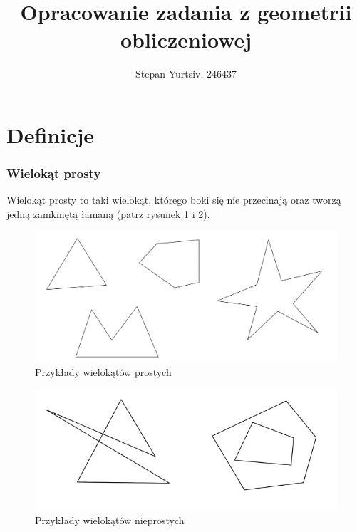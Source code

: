 \documentclass[12pt, a4paper]{article}
\title{Opracowanie zadania z geometrii obliczeniowej}
\author{Stepan Yurtsiv, 246437}
\begin{document}
\maketitle

\section*{Definicje}

\subsubsection*{Wielokąt prosty}

Wielokąt prosty to taki wielokąt, którego boki się nie przecinają oraz tworzą jedną zamkniętą łamaną (patrz rysunek \ref{fig:wielokat_prosty} i \ref{fig:wielokat_nieprosty}).

\begin{figure}[H]
  \begin{center}
  \includegraphics[scale=0.4]{Prosty}
  \caption{Przykłady wielokątów prostych}
  \label{fig:wielokat_prosty}
  \end{center}
\end{figure}

\begin{figure}[H]
  \begin{center}
  \includegraphics[scale=0.4]{Nieprosty}
  \caption{Przykłady wielokątów nieprostych}
  \label{fig:wielokat_nieprosty}
  \end{center}
\end{figure}
\end{document}
